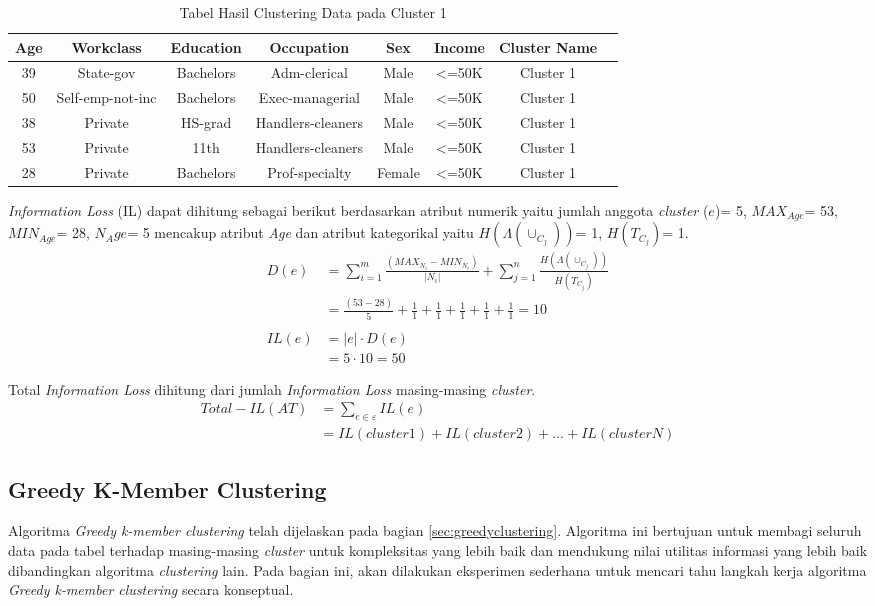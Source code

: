 \begin{table}[H]
\centering
\caption{Tabel Hasil Clustering Data pada Cluster 1}
\begin{tabular}{c c c c c c c c}
\hline 
Age & Workclass & Education & Occupation & Sex & Income & Cluster Name \\ 
\hline 
39 & State-gov & Bachelors & Adm-clerical & Male & <=50K & Cluster 1 \\ 
50 & Self-emp-not-inc & Bachelors & Exec-managerial & Male & <=50K & Cluster 1 \\ 
38 & Private & HS-grad & Handlers-cleaners & Male & <=50K & Cluster 1 \\ 
53 & Private & 11th & Handlers-cleaners & Male & <=50K & Cluster 1 \\ 
28 & Private & Bachelors & Prof-specialty & Female & <=50K & Cluster 1 \\ 
\hline 
\end{tabular} 
\label{table:informationloss}
\end{table}

\noindent \textit{Information Loss} (IL) dapat dihitung sebagai berikut berdasarkan atribut numerik yaitu jumlah anggota \textit{cluster} ($e$)= 5, $MAX_{Age}$= 53, $MIN_{Age}$= 28, $N_Age$= 5 mencakup atribut \textit{Age} dan atribut kategorikal yaitu $H(\Lambda(\cup_{C_j}))$= 1, $H(T_{C_j})$= 1.
\begin{align*}
D(e) &= \sum_{i=1}^{m} \frac{(MAX_{N_i} - MIN_{N_i})}{|N_i|} + \sum_{j=1}^{n}\frac{H(\Lambda(\cup_{C_j}))}{H(T_{C_j})}\\
&= \frac{(53 - 28)}{5} + \frac{1}{1}+\frac{1}{1}+\frac{1}{1}+\frac{1}{1}+\frac{1}{1} = 10\\\\
IL(e) &= |e| \cdot D(e)\\
&= 5 \cdot 10 = 50
\end{align*}

\noindent Total \textit{Information Loss} dihitung dari jumlah \textit{Information Loss} masing-masing \textit{cluster}.
\begin{align*}
Total-IL(AT) &= \sum_{e \in \varepsilon}^{}  IL(e)\\
&= IL(cluster1)+IL(cluster2)+\ldots+IL(clusterN)
\end{align*}

\subsection{Greedy K-Member Clustering}
Algoritma \textit{Greedy k-member clustering} telah dijelaskan pada bagian \ref{sec:greedyclustering}. Algoritma ini bertujuan untuk membagi seluruh data pada tabel terhadap masing-masing \textit{cluster} untuk kompleksitas yang lebih baik dan mendukung nilai utilitas informasi yang lebih baik dibandingkan algoritma \textit{clustering} lain. Pada bagian ini, akan dilakukan eksperimen sederhana untuk mencari tahu langkah kerja algoritma \textit{Greedy k-member clustering} secara konseptual.


